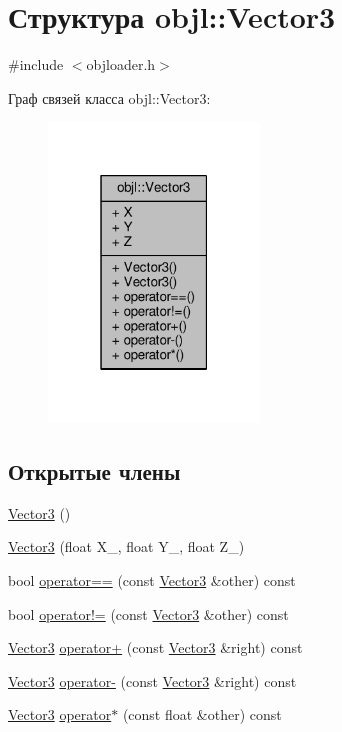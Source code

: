 \hypertarget{structobjl_1_1_vector3}{}\section{Структура objl\+:\+:Vector3}
\label{structobjl_1_1_vector3}


{\ttfamily \#include $<$objloader.\+h$>$}



Граф связей класса objl\+:\+:Vector3\+:
\nopagebreak
\begin{figure}[H]
\begin{center}
\leavevmode
\includegraphics[width=159pt]{d7/d00/structobjl_1_1_vector3__coll__graph}
\end{center}
\end{figure}
\subsection*{Открытые члены}
\begin{DoxyCompactItemize}
\item 
\hyperlink{structobjl_1_1_vector3_a37f8ca281c0e2097fa2728266ebef56c}{Vector3} ()
\item 
\hyperlink{structobjl_1_1_vector3_afed600f7ee15aa60d8e384da46c2d12a}{Vector3} (float X\+\_\+, float Y\+\_\+, float Z\+\_\+)
\item 
bool \hyperlink{structobjl_1_1_vector3_a429dcb4a13c69cb5975fd5484dd74425}{operator==} (const \hyperlink{structobjl_1_1_vector3}{Vector3} \&other) const 
\item 
bool \hyperlink{structobjl_1_1_vector3_ad8aeae2f5387632095757c178efccdab}{operator!=} (const \hyperlink{structobjl_1_1_vector3}{Vector3} \&other) const 
\item 
\hyperlink{structobjl_1_1_vector3}{Vector3} \hyperlink{structobjl_1_1_vector3_a71016900e6eb6119fa60f263f428e621}{operator+} (const \hyperlink{structobjl_1_1_vector3}{Vector3} \&right) const 
\item 
\hyperlink{structobjl_1_1_vector3}{Vector3} \hyperlink{structobjl_1_1_vector3_ada21925e1b5aef10ccb16a4578f337ca}{operator-\/} (const \hyperlink{structobjl_1_1_vector3}{Vector3} \&right) const 
\item 
\hyperlink{structobjl_1_1_vector3}{Vector3} \hyperlink{structobjl_1_1_vector3_a10de58f83a9512340154a0f84d2d0a06}{operator$\ast$} (const float \&other) const 
\end{DoxyCompactItemize}
